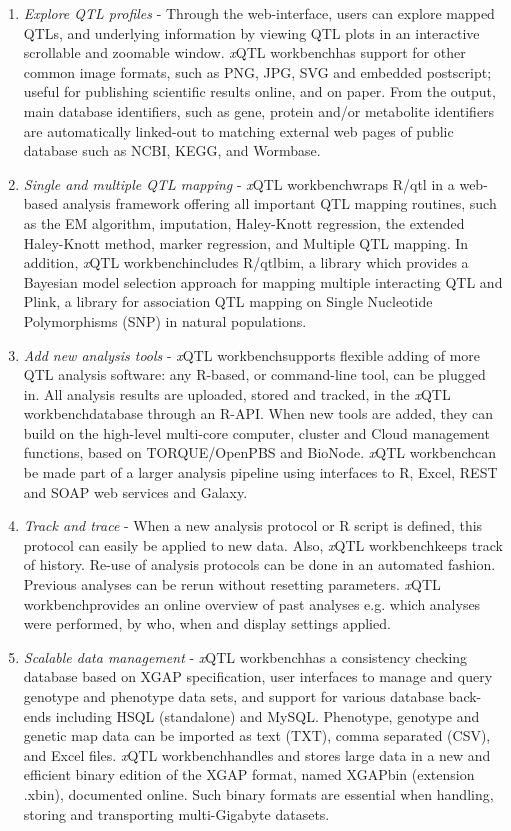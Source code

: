 \documentclass[8pt, twoside, a5paper]{report}
\newcommand{\italic}[1]{\textit{#1}}
\newcommand{\xqtlwb}{{\it x}QTL workbench}
\begin{document}
\begin{enumerate}\itemsep1pt
\item \italic{Explore QTL profiles} - Through the web-interface, users can explore mapped QTLs, and underlying information 
by viewing QTL plots in an interactive scrollable and zoomable window. \xqtlwb has support for other common image 
formats, such as PNG, JPG, SVG and embedded postscript; useful for publishing scientific results online, and on 
paper. From the output, main database identifiers, such as gene, protein and/or metabolite identifiers are 
automatically linked-out to matching external web pages of public database such as NCBI, KEGG, and Wormbase.

\item \italic{Single and multiple QTL mapping} - \xqtlwb wraps R/qtl\cite{Broman:2003, Arends:2010} in a web-based analysis
framework offering all important QTL mapping routines, such as the EM algorithm, imputation, Haley-Knott regression, 
the extended Haley-Knott method, marker regression, and Multiple QTL mapping. In addition, \xqtlwb includes 
R/qtlbim, a library which provides a Bayesian model selection approach for mapping multiple interacting QTL\cite{Yandell:2007} 
and Plink, a library for association QTL mapping on Single Nucleotide Polymorphisms (SNP) in natural 
populations\cite{Purcell:2007}.

\item \italic{Add new analysis tools} - \xqtlwb supports flexible adding of more QTL analysis software: any R-based, or 
command-line tool, can be plugged in. All analysis results are uploaded, stored and tracked, in the \xqtlwb database 
through an R-API. When new tools are added, they can build on the high-level multi-core computer, cluster and 
Cloud management functions, based on TORQUE/OpenPBS and BioNode\cite{Prins:2012}. \xqtlwb can be made part of a larger 
analysis pipeline using interfaces to R, Excel, REST and SOAP web services and Galaxy\cite{Goecks:2010}.

\item \italic{Track and trace} - When a new analysis protocol or R script is defined, this protocol can 
easily be applied to new data. Also, \xqtlwb keeps track of history. Re-use of analysis protocols can be done in an 
automated fashion. Previous analyses can be rerun without resetting parameters. \xqtlwb provides an online overview 
of past analyses e.g. which analyses were performed, by who, when and display settings applied.

\item \italic{Scalable data management} - \xqtlwb has a consistency checking database based on XGAP specification\cite{Swertz:2010a}, 
user interfaces to manage and query genotype and phenotype data sets, and support for various database back-ends including 
HSQL (standalone) and MySQL. Phenotype, genotype and genetic map data can be imported as text (TXT), comma separated (CSV), 
and Excel files. \xqtlwb handles and stores large data in a new and efficient binary edition of the XGAP format, named 
XGAPbin (extension .xbin), documented online. Such binary formats are essential when handling, storing and transporting 
multi-Gigabyte datasets.


\end{enumerate}
\end{document}
